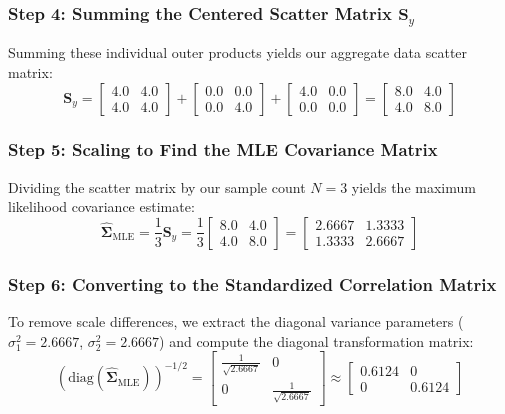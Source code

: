 \documentclass{article}
\begin{document}
\subsubsection{Step 4: Summing the Centered Scatter Matrix $\mathbf{S}_y$}
Summing these individual outer products yields our aggregate data scatter matrix:
\begin{equation}
\mathbf{S}_y = \begin{bmatrix} 4.0 & 4.0 \\ 4.0 & 4.0 \end{bmatrix} + \begin{bmatrix} 0.0 & 0.0 \\ 0.0 & 4.0 \end{bmatrix} + \begin{bmatrix} 4.0 & 0.0 \\ 0.0 & 0.0 \end{bmatrix} = \begin{bmatrix} \mathbf{8.0} & \mathbf{4.0} \\ \mathbf{4.0} & \mathbf{8.0} \end{bmatrix}
\end{equation}

\subsubsection{Step 5: Scaling to Find the MLE Covariance Matrix}
Dividing the scatter matrix by our sample count $N = 3$ yields the maximum likelihood covariance estimate:
\begin{equation}
\hat{\boldsymbol{\Sigma}}_{\text{MLE}} = \frac{1}{3}\mathbf{S}_y = \frac{1}{3}\begin{bmatrix} 8.0 & 4.0 \\ 4.0 & 8.0 \end{bmatrix} = \begin{bmatrix} \mathbf{2.6667} & \mathbf{1.3333} \\ \mathbf{1.3333} & \mathbf{2.6667} \end{bmatrix}
\end{equation}

\subsubsection{Step 6: Converting to the Standardized Correlation Matrix}
To remove scale differences, we extract the diagonal variance parameters ($\sigma_1^2 = 2.6667$, $\sigma_2^2 = 2.6667$) and compute the diagonal transformation matrix:
\begin{equation}
\left(\text{diag}(\hat{\boldsymbol{\Sigma}}_{\text{MLE}})\right)^{-1/2} = \begin{bmatrix} \frac{1}{\sqrt{2.6667}} & 0 \\ 0 & \frac{1}{\sqrt{2.6667}} \end{bmatrix} \approx \begin{bmatrix} 0.6124 & 0 \\ 0 & 0.6124 \end{bmatrix}
\end{equation}
\end{document}

